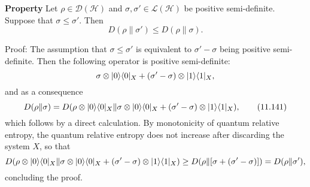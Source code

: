 \textbf{Property}
Let $\rho \in \mathcal{D}(\mathcal{H})$ and $\sigma, \sigma' \in \mathcal{L}(\mathcal{H})$ be positive semi-definite. Suppose that $\sigma \leq \sigma'$. Then
\[
D(\rho \| \sigma') \leq D(\rho \| \sigma).
\]


Proof:
The assumption that $\sigma \leq \sigma'$ is equivalent to $\sigma' - \sigma$ being positive semi-definite. Then the following operator is positive semi-definite: 
\[
\sigma \otimes \lvert0\rangle\langle0\rvert_X + (\sigma' - \sigma) \otimes \lvert1\rangle\langle1\rvert_X,
\]
and as a consequence
\[
D(\rho \| \sigma) = D(\rho \otimes \lvert0\rangle\langle0\rvert_X \| \sigma \otimes \lvert0\rangle\langle0\rvert_X + (\sigma' - \sigma) \otimes \lvert1\rangle\langle1\rvert_X), \tag{11.141}
\]
which follows by a direct calculation. By monotonicity of quantum relative entropy, the quantum relative entropy does not increase after discarding the system $X$, so that
\[
D(\rho \otimes \lvert0\rangle\langle0\rvert_X \| \sigma \otimes \lvert0\rangle\langle0\rvert_X + (\sigma' - \sigma) \otimes \lvert1\rangle\langle1\rvert_X)
\geq D(\rho \| [\sigma + (\sigma' - \sigma)]) = D(\rho \| \sigma'),
\]
concluding the proof.
